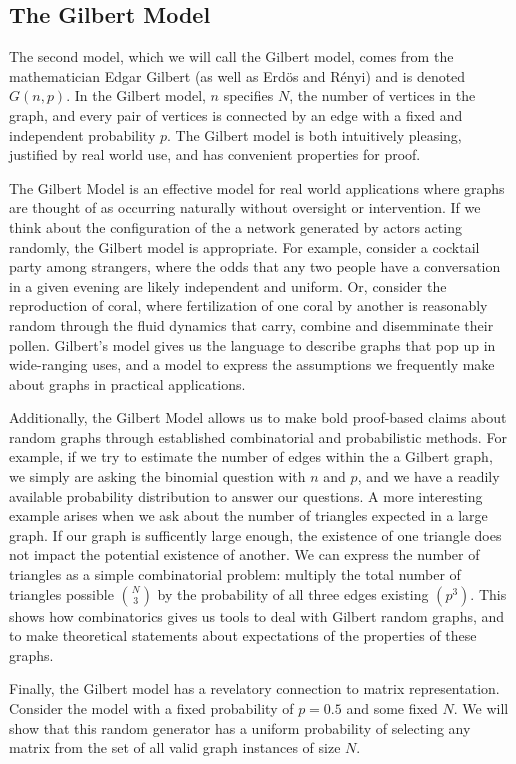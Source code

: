 \documentclass[11pt,a4paper]{report}
\begin{document}
\subsection{The Gilbert Model}

The second model, which we will call the Gilbert model, comes from the mathematician Edgar Gilbert (as well as Erd\"os and R\'enyi) and is denoted $G(n, p)$.
In the Gilbert model, $n$ specifies $N$, the number of vertices in the graph, and every pair of vertices is connected by an edge with a fixed and independent probability $p$.
The Gilbert model is both intuitively pleasing, justified by real world use, and has convenient properties for proof.

The Gilbert Model is an effective model for real world applications where graphs are thought of as occurring naturally without oversight or intervention.
If we think about the configuration of the a network generated by actors acting randomly, the Gilbert model is appropriate.
For example, consider a cocktail party among strangers, where the odds that any two people have a conversation in a given evening are likely independent and uniform.
Or, consider the reproduction of coral, where fertilization of one coral by another is reasonably random through the fluid dynamics that carry, combine and disemminate their pollen.
Gilbert's model gives us the language to describe graphs that pop up in wide-ranging uses, and a model to express the assumptions we frequently make about graphs in practical applications.

Additionally, the Gilbert Model allows us to make bold proof-based claims about random graphs through established combinatorial and probabilistic methods.
For example, if we try to estimate the number of edges within the a Gilbert graph, we simply are asking the binomial question with $n$ and $p$, and we have a readily available probability distribution to answer our questions.
A more interesting example arises when we ask about the number of triangles expected in a large graph.
If our graph is sufficently large enough, the existence of one triangle does not impact the potential existence of another.
We can express the number of triangles as a simple combinatorial problem: multiply the total number of triangles possible $\binom{N}{3}$ by the probability of all three edges existing $(p^3)$.
This shows how combinatorics gives us tools to deal with Gilbert random graphs, and to make theoretical statements about expectations of the properties of these graphs.

Finally, the Gilbert model has a revelatory connection to matrix representation.
Consider the model with a fixed probability of $p=0.5$ and some fixed $N$.
We will show that this random generator has a uniform probability of selecting any matrix from the set of all valid graph instances of size $N$.
\end{document}
